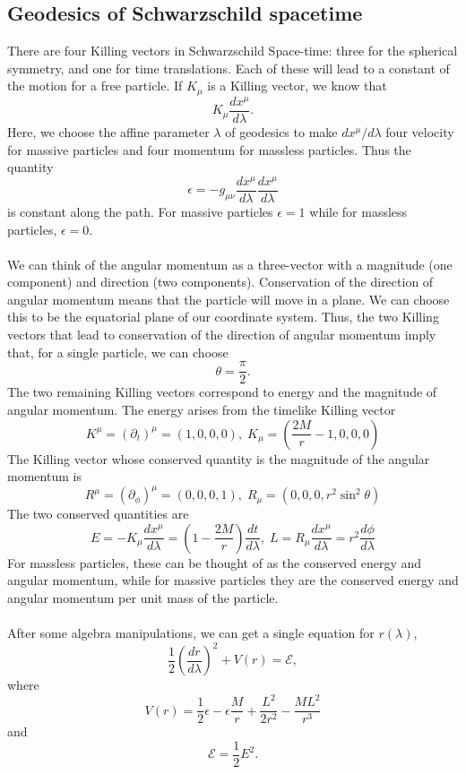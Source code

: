 \subsection{Geodesics of Schwarzschild spacetime}
There are four Killing vectors in Schwarzschild Space-time: three for the spherical symmetry, and one for time translations.
Each of these will lead to a constant of the motion for a free particle.
If $K_{\mu}$ is a Killing vector, we know that
\[K_{\mu} \frac{dx^{\mu}}{d\lambda}.\]
Here, we choose the affine parameter $\lambda$ of geodesics to make $dx^{\mu}/d\lambda$ four velocity for massive particles and four momentum for massless particles. Thus the quantity
\[\epsilon = -g_{\mu\nu} \frac{dx^{\mu}}{d\lambda} \frac{dx^{\mu}}{d\lambda}\]
is constant along the path. For massive particles $\epsilon = 1$ while for massless particles, $\epsilon = 0$.
\\ \\
We can think of the angular momentum as a three-vector with a magnitude (one component) and direction (two components). 
Conservation of the direction of angular momentum means that the particle will move in a plane. We can choose this to be the equatorial plane of our coordinate system. Thus, the two Killing vectors that lead to conservation of the direction of angular momentum imply that, for a single particle, we can choose
\[\theta = \frac{\pi}{2}.\]
The two remaining Killing vectors correspond to energy and the magnitude of angular momentum. The energy arises from the timelike Killing vector
\[K^{\mu} = (\partial_t)^{\mu} = (1,0,0,0), \; K_{\mu} = (\frac{2M}{r}-1, 0,0,0)\]
The Killing vector whose conserved quantity is the magnitude of the angular momentum is
\[R^{\mu} = (\partial_{\phi})^{\mu} = (0,0,0,1), \; R_{\mu} = (0,0,0,r^2\sin^2\theta) \]
The two conserved quantities are
\[E = -K_{\mu} \frac{dx^{\mu}}{d\lambda} = \left( 1- \frac{2M}{r}\right) \frac{dt}{d\lambda}, \; L = R_{\mu} \frac{dx^{\mu}}{d\lambda} = r^2\frac{d\phi}{d\lambda}\]
For massless particles, these can be thought of as the conserved energy and angular momentum, while for massive particles they are the conserved energy and angular momentum per unit mass of the particle.
\\ \\
After some algebra manipulations, we can get a single equation for $r(\lambda)$,
\[\frac{1}{2} \left( \frac{dr}{d\lambda} \right)^2 + V(r) = \mathcal{E},\]
where
\[V(r) = \frac{1}{2}\epsilon - \epsilon \frac{M}{r} + \frac{L^2}{2r^2} - \frac{ML^2}{r^3}\]
and
\[\mathcal{E} = \frac{1}{2}E^2.\]

